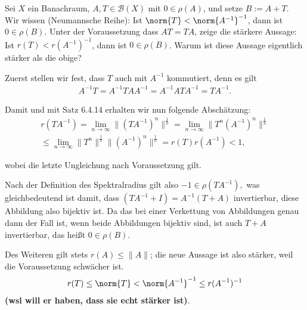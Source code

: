 \begin{exercise}[22/1]

Sei $X$ ein Banachraum, $A, T \in \mathcal{B}(X)$ mit $0 \in \rho(A)$, und setze $B := A + T$.
Wir wissen (Neumannsche Reihe):
Ist $\norm{T} < \norm{A^{-1}}^{-1}$, dann ist $0 \in \rho(B)$.
Unter der Voraussetzung dass $A T = T A$, zeige die stärkere Aussage:
Ist $r(T) < r(A^{-1})^{-1}$, dann ist $0 \in \rho(B)$.
Warum ist diese Aussage eigentlich stärker als die obige?

\end{exercise}

\begin{solution}
  Zuerst stellen wir fest, dass $T$ auch mit $A^{-1}$ kommutiert, denn es gilt
  \begin{align}
      A^{-1}T = A^{-1}TAA^{-1} = A^{-1}ATA^{-1} = TA^{-1}.
  \end{align}

  Damit und mit Satz 6.4.14 erhalten wir nun folgende Abschätzung:
  \begin{align}
      r(TA^{-1}) = \lim\limits_{n \rightarrow \infty}{\|(TA^{-1})^n\|^{\frac{1}{n}}} =
      \lim\limits_{n \rightarrow \infty}{\|T^n(A^{-1})^n\|^{\frac{1}{n}}} \\ \leq
      \lim\limits_{n \rightarrow \infty}{\|T^n\|^{\frac{1}{n}}\|(A^{-1})^n\|^{\frac{1}{n}}} =
      r(T) r(A^{-1}) < 1,
  \end{align}

  wobei die letzte Ungleichung nach Voraussetzung gilt.

  Nach der Definition des Spektralradius gilt also $-1 \in \rho(TA^{-1}),$ was gleichbedeutend ist damit, dass $(TA^{-1} + I) = A^{-1} (T + A)$ invertierbar, diese Abbildung also bijektiv ist.
  Da das bei einer Verkettung von Abbildungen genau dann der Fall ist, wenn beide Abbildungen bijektiv sind, ist auch $T + A$ invertierbar, das heißt $0 \in \rho(B).$


  Des Weiteren gilt stets $r(A) \leq \|A\|$; die neue Aussage ist also stärker, weil die Voraussetzung schwächer ist.
  \begin{align*}
    r(T) \leq \norm{T} < \norm{A^{-1}}^{-1} \leq r(A^{-1})^{-1}
  \end{align*}
  \textbf{(wsl will er haben, dass sie echt stärker ist)}.
\end{solution}
